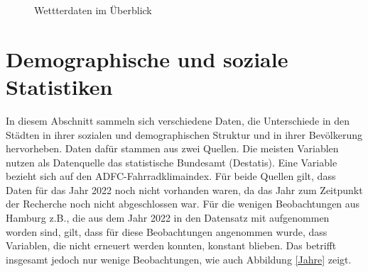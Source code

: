 \documentclass[a4paper,12pt]{thesis}
\begin{document}
\begin{figure}%
	\centering
	\qquad
	\caption{Wettterdaten im Überblick}%
	\label{fig:TempNied}%
\end{figure}


\section{Demographische und soziale Statistiken}\label{Daten_Stadt}

In diesem Abschnitt sammeln sich verschiedene Daten, die Unterschiede in den Städten in ihrer sozialen und demographischen Struktur und in ihrer Bevölkerung hervorheben. Daten dafür stammen aus zwei Quellen. Die meisten Variablen nutzen als Datenquelle das statistische Bundesamt (Destatis). Eine Variable bezieht sich auf den ADFC-Fahrradklimaindex. Für beide Quellen gilt, dass Daten für das Jahr 2022 noch nicht vorhanden waren, da das Jahr zum Zeitpunkt der Recherche noch nicht abgeschlossen war. Für die wenigen Beobachtungen aus Hamburg z.B., die aus dem Jahr 2022 in den Datensatz mit aufgenommen worden sind, gilt, dass für diese Beobachtungen angenommen wurde, dass Variablen, die nicht erneuert werden konnten, konstant blieben. Das betrifft insgesamt jedoch nur wenige Beobachtungen, wie auch Abbildung \ref{Jahre} zeigt.
\end{document}
